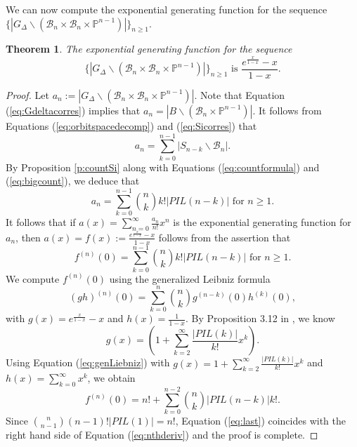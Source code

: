 \documentclass[12pt]{amsart}
\numberwithin{equation}{section}
\newtheorem{thm}{Theorem}[section]
\theoremstyle{remark}
\theoremstyle{definition}
\newcommand{\B}{\mathcal{B}}
\begin{document}
We can now compute the exponential generating function for the sequence 
$\{|G_{\Delta}\backslash(\B_{n}\times\B_{n}\times\mathbb{P}^{n-1})|\}_{n\geq 1}.$  
\begin{thm}\label{thm:bigegf}
The exponential generating function for the sequence 
\begin{equation}\label{eq:biggenfun}
\{|G_{\Delta}\backslash(\B_{n}\times\B_{n}\times\mathbb{P}^{n-1})|\}_{n\geq 1}\mbox{ is } \frac{e^{\frac{x}{1-x}}-x}{1-x}.
\end{equation}
\end{thm}
\begin{proof}
Let $a_n:=|G_{\Delta}\backslash(\B_{n}\times\B_{n}\times\mathbb{P}^{n-1})|.$   Note that Equation (\ref{eq:Gdeltacorres}) implies that $a_n=|B\backslash(\B_{n}\times\mathbb{P}^{n-1})|.$ It follows from Equations (\ref{eq:orbitspacedecomp}) and (\ref{eq:Sicorres}) that
\begin{equation}\label{eq:bigcount}
a_n=\displaystyle\sum_{k=0}^{n-1} |S_{n-k}\backslash\B_{n}|.
\end{equation}
By  Proposition \ref{p:countSi} along with Equations (\ref{eq:countformula}) and (\ref{eq:bigcount}), we deduce that
\begin{equation}\label{eq:nextcount}
a_n=\displaystyle\sum_{k=0}^{n-1} {n\choose k} k! |PIL(n-k)| \mbox{ for } n\geq 1.
\end{equation}
It follows that if $a(x)= \sum_{n=0}^{\infty} \frac{a_n}{n!}x^n$ is the exponential generating function for $a_n$, then $a(x)=f(x):=\frac{e^{\frac{x}{1-x}}-x}{1-x}$ follows from the assertion that
\begin{equation}\label{eq:nthderiv}
f^{(n)}(0)=\displaystyle\sum_{k=0}^{n-1} {n\choose k} k! |PIL(n-k)| \mbox{ for } n\geq 1.
\end{equation}
We compute $f^{(n)}(0)$ using the generalized Leibniz formula 
\begin{equation}\label{eq:genLiebniz}
(gh)^{(n)}(0)=\sum_{k=0}^{n} {n\choose k} g^{(n-k)} (0) h^{(k)}(0),
\end{equation}
with $g(x)=e^{\frac{x}{1-x}}-x$ and $h(x)=\frac{1}{1-x}.$
By Proposition 3.12 in \cite{CE21II}, we know
$$
g(x)=\displaystyle\left(1+\displaystyle\sum_{k=2}^{\infty} \frac{|PIL(k)|}{k!} x^{k}\right).
$$
Using Equation (\ref{eq:genLiebniz}) with $g(x)=1+\displaystyle\sum_{k=2}^{\infty} \frac{|PIL(k)|}{k!} x^{k}$ and $h(x)=\sum_{k=0}^{\infty}x^{k}$, we obtain 
\begin{equation}\label{eq:last}
f^{(n)}(0)=n! + \displaystyle\sum_{k=0}^{n-2} {n\choose k} |PIL(n-k)| k!.
\end{equation}
Since ${n\choose n-1} (n-1) ! |PIL(1)|=n!$, Equation (\ref{eq:last}) coincides with the right hand side of Equation (\ref{eq:nthderiv}) and the proof is complete.





\end{proof}
\end{document}

